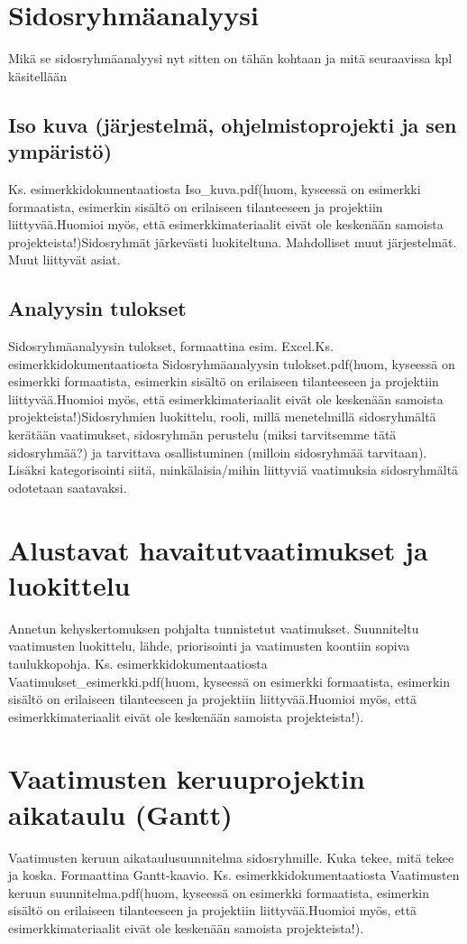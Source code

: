     \lipsum[3]


\section{Sidosryhmäanalyysi}

    Mikä se sidosryhmäanalyysi nyt sitten on tähän kohtaan ja mitä seuraavissa kpl käsitellään

    \subsection{Iso kuva (järjestelmä, ohjelmisto\-projekti ja sen ympä\-ristö)}

    Ks. esimerkkidokumentaatiosta Iso\_kuva.pdf(huom, kyseessä on esimerkki formaatista, esimerkin sisältö on erilaiseen tilanteeseen ja projektiin liittyvää.Huomioi myös, että esimerkkimateriaalit eivät ole keskenään samoista projekteista!)Sidosryhmät järkevästi luokiteltuna. Mahdolliset muut järjestelmät. Muut liittyvät asiat.

    \subsection{Analyysin tulokset}
    
    Sidosryhmäanalyysin tulokset, formaattina esim. Excel.Ks. esimerkkidokumentaatiosta Sidosryhmäanalyysin tulokset.pdf(huom, kyseessä on esimerkki formaatista, esimerkin sisältö on erilaiseen tilanteeseen ja projektiin liittyvää.Huomioi myös, että esimerkkimateriaalit eivät ole keskenään samoista projekteista!)Sidosryhmien luokittelu, rooli, millä menetelmillä sidosryhmältä kerätään vaatimukset, sidosryhmän perustelu (miksi tarvitsemme tätä sidosryhmää?) ja tarvittava osallistuminen (milloin sidosryhmää tarvitaan). Lisäksi kategorisointi siitä, minkälaisia/mihin liittyviä vaatimuksia sidosryhmältä odotetaan saatavaksi.

\section{Alustavat havaitutvaatimukset ja luokittelu}

    Annetun kehyskertomuksen pohjalta tunnistetut vaatimukset. Suunniteltu vaatimusten luokittelu, lähde, priorisointi ja vaatimusten koontiin sopiva taulukkopohja. Ks. esimerkkidokumentaatiosta Vaatimukset\_esimerkki.pdf(huom, kyseessä on esimerkki formaatista, esimerkin sisältö on erilaiseen tilanteeseen ja projektiin liittyvää.Huomioi myös, että esimerkkimateriaalit eivät ole keskenään samoista projekteista!).

\section{Vaatimusten keruuprojektin aikataulu (Gantt)}

    Vaatimusten keruun aikataulusuunnitelma sidosryhmille. Kuka tekee, mitä tekee ja koska. Formaattina Gantt-kaavio. Ks. esimerkkidokumentaatiosta Vaatimusten keruun suunnitelma.pdf(huom, kyseessä on esimerkki formaatista, esimerkin sisältö on erilaiseen tilanteeseen ja projektiin liittyvää.Huomioi myös, että esimerkkimateriaalit eivät ole keskenään samoista projekteista!).
